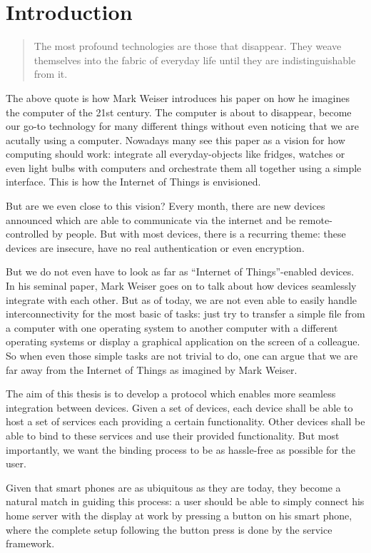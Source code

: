 \section{Introduction}

\begin{quote}
    The most profound technologies are those that disappear.
    They weave themselves into the fabric of everyday life until they are indistinguishable from it. \cite{weiser1991computer}
\end{quote}

The above quote is how Mark Weiser introduces his paper on how he imagines the computer of the 21st century.
The computer is about to disappear, become our go-to technology for many different things without even noticing that we are acutally using a computer.
Nowadays many see this paper as a vision for how computing should work: integrate all everyday-objects like fridges, watches or even light bulbs with computers and orchestrate them all together using a simple interface.
This is how the Internet of Things is envisioned.

But are we even close to this vision?
Every month, there are new devices announced which are able to communicate via the internet and be remote-controlled by people.
But with most devices, there is a recurring theme: these devices are insecure, have no real authentication or even encryption.

But we do not even have to look as far as ``Internet of Things''-enabled devices.
In his seminal paper, Mark Weiser goes on to talk about how devices seamlessly integrate with each other.
But as of today, we are not even able to easily handle interconnectivity for the most basic of tasks: just try to transfer a simple file from a computer with one operating system to another computer with a different operating systems or display a graphical application on the screen of a colleague.
So when even those simple tasks are not trivial to do, one can argue that we are far away from the Internet of Things as imagined by Mark Weiser.

The aim of this thesis is to develop a protocol which enables more seamless integration between devices.
Given a set of devices, each device shall be able to host a set of services each providing a certain functionality.
Other devices shall be able to bind to these services and use their provided functionality.
But most importantly, we want the binding process to be as hassle-free as possible for the user.

Given that smart phones are as ubiquitous as they are today, they become a natural match in guiding this process:
a user should be able to simply connect his home server with the display at work by pressing a button on his smart phone, where the complete setup following the button press is done by the service framework.

